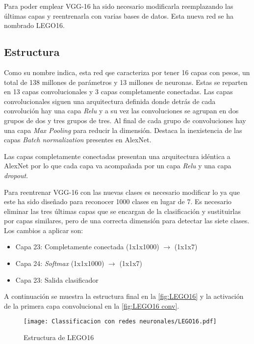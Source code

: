 Para poder emplear VGG-16 ha sido necesario modificarla reemplazando las últimas capas y reentrenarla con varias bases de datos. Esta nueva red se ha nombrado LEGO16.

\subsection{Estructura}
Como su nombre indica, esta red qse caracteriza por tener 16 capas con pesos, un total de 138 millones de parámetros y 13 millones de neuronas. Estas se reparten en 13 capas convolucionales y 3 capas completamente conectadas. Las capas convolucionales siguen una arquitectura definida donde detrás de cada convolución hay una capa \textit{Relu} y a su vez las convoluciones se agrupan en dos grupos de dos y tres grupos de tres. Al final de cada grupo de convoluciones hay una capa \textit{Max Pooling} para reducir la dimensión. Destaca la inexistencia de las capas \textit{Batch normalization} presentes en AlexNet.

Las capas completamente conectadas presentan una arquitectura idéntica a AlexNet por lo que cada capa va acompañada por un capa \textit{Relu} y una capa \textit{dropout}.

Para reentrenar VGG-16 con las nuevas clases es necesario modificar lo ya que este ha sido diseñado para reconocer 1000 clases en lugar de 7. Es necesario eliminar las tres últimas capas que se encargan de la clasificación y sustituirlas por capas similares, pero de una correcta dimensión para detectar las siete clases. Los cambios a aplicar son:
\begin{itemize}
\item Capa 23: Completamente conectada (1x1x1000) $\rightarrow$ (1x1x7)
\item Capa 24: \textit{Softmax} (1x1x1000) $\rightarrow$ (1x1x7)
\item Capa 23: Salida clasificador
\end{itemize}

A continuación se muestra la estructura final en la \autoref{fig:LEGO16} y la activación de la primera capa convolucional en la \autoref{fig:LEGO16 conv}.

\begin{figure}[ht]  %
	\centering
	\texttt{[image: Classificacion con redes neuronales/LEGO16.pdf]}
	\caption{Estructura de LEGO16}
	\label{fig:LEGO16}
	\vspace{-5pt}
\end{figure}

